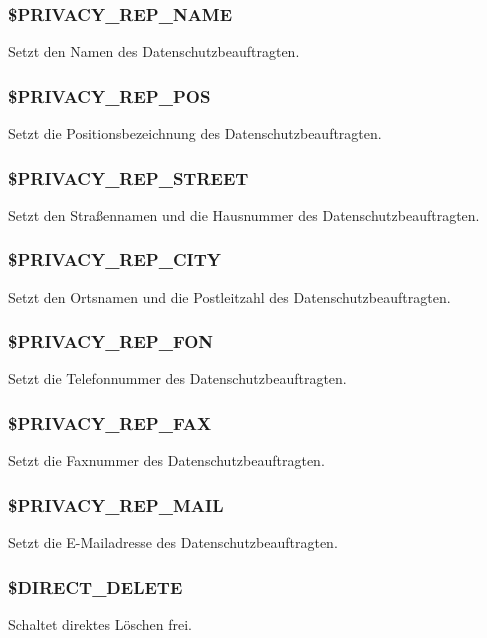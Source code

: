\subsubsection{\$PRIVACY\_REP\_NAME} Setzt den Namen des Datenschutzbeauftragten.
\subsubsection{\$PRIVACY\_REP\_POS} Setzt die Positionsbezeichnung des Datenschutzbeauftragten.
\subsubsection{\$PRIVACY\_REP\_STREET} Setzt den Straßennamen und die Hausnummer des Datenschutzbeauftragten.
\subsubsection{\$PRIVACY\_REP\_CITY} Setzt den Ortsnamen und die Postleitzahl des Datenschutzbeauftragten.
\subsubsection{\$PRIVACY\_REP\_FON} Setzt die Telefonnummer des Datenschutzbeauftragten.
\subsubsection{\$PRIVACY\_REP\_FAX} Setzt die Faxnummer des Datenschutzbeauftragten.
\subsubsection{\$PRIVACY\_REP\_MAIL} Setzt die E-Mailadresse des Datenschutzbeauftragten.
\subsubsection{\$DIRECT\_DELETE} Schaltet direktes Löschen frei.
